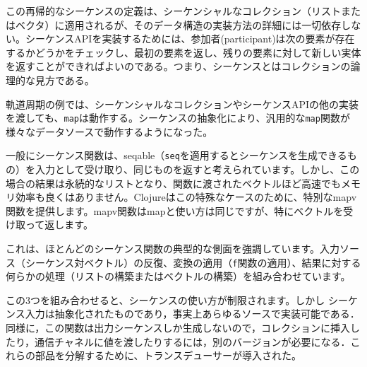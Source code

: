 この再帰的なシーケンスの定義は、シーケンシャルなコレクション（リストまたはベクタ）に適用されるが、そのデータ構造の実装方法の詳細には一切依存しない。シーケンスAPIを実装するためには、参加者(participant)は次の要素が存在するかどうかをチェックし、最初の要素を返し、残りの要素に対して新しい実体を返すことができればよいのである。つまり、シーケンスとはコレクションの論理的な見方である。

軌道周期の例では、シーケンシャルなコレクションやシーケンスAPIの他の実装を渡しても、\texttt{map}は動作する。シーケンスの抽象化により、汎用的な\texttt{map}関数が様々なデータソースで動作するようになった。

一般にシーケンス関数は、seqable（\texttt{seq}を適用するとシーケンスを生成できるもの）を入力として受け取り、同じものを返すと考えられています。しかし、この場合の結果は永続的なリストとなり、関数に渡されたベクトルほど高速でもメモリ効率も良くはありません。Clojureはこの特殊なケースのために、特別なmapv関数を提供します。mapv関数はmapと使い方は同じですが、特にベクトルを受け取って返します。

これは、ほとんどのシーケンス関数の典型的な側面を強調しています。入力ソース（シーケンス対ベクトル）の反復、変換の適用（\texttt{f}関数の適用）、結果に対する何らかの処理（リストの構築またはベクトルの構築）を組み合わせています。

この3つを組み合わせると、シーケンスの使い方が制限されます。しかし シーケンス入力は抽象化されたものであり，事実上あらゆるソースで実装可能である．同様に，この関数は出力シーケンスしか生成しないので，コレクションに挿入したり，通信チャネルに値を渡したりするには，別のバージョンが必要になる．これらの部品を分解するために、トランスデューサーが導入された。




\begin{lstlisting}[numbers=none]

\end{lstlisting}





